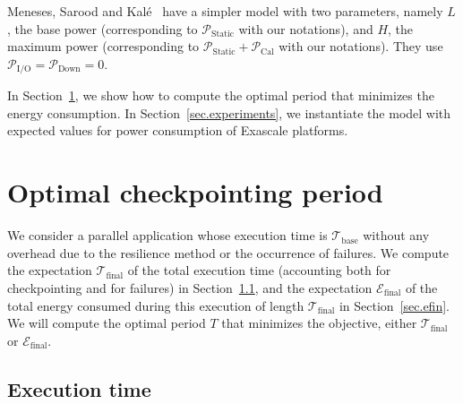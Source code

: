 \documentclass[a4paper]{article}
\newcommand{\ema}[1]{\ensuremath{#1}\xspace}
\renewcommand{\time}[1][]{\ema{\mathcal{T}_{\text{#1}}}}
\newcommand{\tbase}{\time[base]}
\newcommand{\tfin}{\time[final]}
\newcommand{\power}[1][]{\ema{\mathcal{P}_{\text{#1}}}}
\newcommand{\pCal}{\power[Cal]}
\newcommand{\pIO}{\power[I/O]}
\newcommand{\pDown}{\power[Down]}
\newcommand{\pIdle}{\power[Static]}
\newcommand{\E}[1][]{\ema{\mathcal{E}_{\text{#1}}}}
\newcommand{\efin}{\E[final]}
\begin{document}
Meneses, Sarood and Kalé~\cite{Kale2012} have a simpler model with two parameters, namely $L$, the base power
(corresponding to \pIdle with our notations), and $H$, the maximum power 
(corresponding to $\pIdle+\pCal$ with our notations). They use $\pIO = \pDown=0$.

In Section~\ref{sec.period}, we show how to compute the optimal period that minimizes  the energy 
consumption.  In Section~\ref{sec.experiments},  we instantiate the model with expected values for power 
consumption of Exascale platforms.


\section{Optimal checkpointing period}
\label{sec.period}

We consider a parallel application whose execution time is 
\tbase without any overhead due to the resilience method or the occurrence of failures.
We compute the expectation \tfin of the total execution time (accounting both for checkpointing and for failures)
in Section~\ref{sec.tfin}, and the expectation \efin of the total energy consumed during this execution
of length \tfin in Section~\ref{sec.efin}. We will compute the optimal period $T$ that minimizes
the objective, either \tfin or \efin.


\subsection{Execution time}
\label{sec.tfin}
\end{document}
